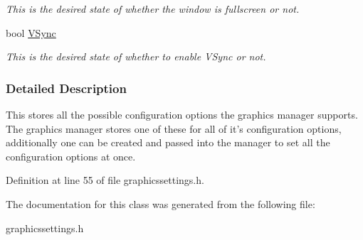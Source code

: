 \begin{DoxyCompactItemize}
\begin{DoxyCompactList}\small\item\em This is the desired state of whether the window is fullscreen or not. \item\end{DoxyCompactList}\item 
\hypertarget{structphys_1_1GraphicsSettings_ade8df051b7da492f0b48014edfca532a}{
bool \hyperlink{structphys_1_1GraphicsSettings_ade8df051b7da492f0b48014edfca532a}{VSync}}
\label{d0/dd0/structphys_1_1GraphicsSettings_ade8df051b7da492f0b48014edfca532a}

\begin{DoxyCompactList}\small\item\em This is the desired state of whether to enable VSync or not. \item\end{DoxyCompactList}\end{DoxyCompactItemize}


\subsubsection{Detailed Description}
This stores all the possible configuration options the graphics manager supports. The graphics manager stores one of these for all of it's configuration options, additionally one can be created and passed into the manager to set all the configuration options at once. 

Definition at line 55 of file graphicssettings.h.



The documentation for this class was generated from the following file:\begin{DoxyCompactItemize}
\item 
graphicssettings.h\end{DoxyCompactItemize}
